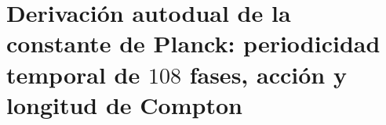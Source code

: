 \chapter{Derivación autodual de la constante de Planck: periodicidad temporal de \(108\) fases, acción y longitud de Compton}
\label{chap:p3-final:36:planck_autodual}




